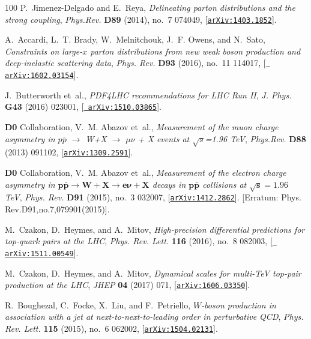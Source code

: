 \begin{thebibliography}{100}
P.~Jimenez-Delgado and E.~Reya, {\it {Delineating parton distributions and the
  strong coupling}},  {\em Phys.Rev.} {\bf D89} (2014), no.~7 074049,
  [\href{http://arxiv.org/abs/1403.1852}{{\tt arXiv:1403.1852}}].

A.~Accardi, L.~T. Brady, W.~Melnitchouk, J.~F. Owens, and N.~Sato, {\it
  {Constraints on large-$x$ parton distributions from new weak boson production
  and deep-inelastic scattering data}},  {\em Phys. Rev.} {\bf D93} (2016),
  no.~11 114017, [\href{http://arxiv.org/abs/1602.03154}{{\tt
  arXiv:1602.03154}}].

J.~Butterworth et~al., {\it {PDF4LHC recommendations for LHC Run II}},  {\em J.
  Phys.} {\bf G43} (2016) 023001, [\href{http://arxiv.org/abs/1510.03865}{{\tt
  arXiv:1510.03865}}].

{\bf D0} Collaboration, V.~M. Abazov et~al., {\it {Measurement of the muon
  charge asymmetry in $p\bar{p}$ $\to$ W+X $\to$ $\mu$$\nu$ + X events at
  $\sqrt{s}$=1.96 TeV}},  {\em Phys.Rev.} {\bf D88} (2013) 091102,
  [\href{http://arxiv.org/abs/1309.2591}{{\tt arXiv:1309.2591}}].

{\bf D0} Collaboration, V.~M. Abazov et~al., {\it {Measurement of the electron
  charge asymmetry in $\boldsymbol{p\bar{p}\rightarrow W+X \rightarrow e\nu
  +X}$ decays in $\boldsymbol{p\bar{p}}$ collisions at
  $\boldsymbol{\sqrt{s}=1.96}$ TeV}},  {\em Phys. Rev.} {\bf D91} (2015), no.~3
  032007, [\href{http://arxiv.org/abs/1412.2862}{{\tt arXiv:1412.2862}}].
  [Erratum: Phys. Rev.D91,no.7,079901(2015)].

M.~Czakon, D.~Heymes, and A.~Mitov, {\it {High-precision differential
  predictions for top-quark pairs at the LHC}},  {\em Phys. Rev. Lett.} {\bf
  116} (2016), no.~8 082003, [\href{http://arxiv.org/abs/1511.00549}{{\tt
  arXiv:1511.00549}}].

M.~Czakon, D.~Heymes, and A.~Mitov, {\it {Dynamical scales for multi-TeV
  top-pair production at the LHC}},  {\em JHEP} {\bf 04} (2017) 071,
  [\href{http://arxiv.org/abs/1606.03350}{{\tt arXiv:1606.03350}}].

R.~Boughezal, C.~Focke, X.~Liu, and F.~Petriello, {\it {$W$-boson production in
  association with a jet at next-to-next-to-leading order in perturbative
  QCD}},  {\em Phys. Rev. Lett.} {\bf 115} (2015), no.~6 062002,
  [\href{http://arxiv.org/abs/1504.02131}{{\tt arXiv:1504.02131}}].


\end{thebibliography}
